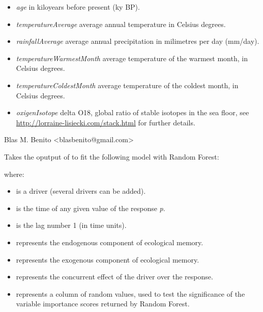 \documentclass[letterpaper]{book}
\begin{document}
\begin{Details}\relax
\begin{itemize}

\item \emph{age}  in kiloyears before present (ky BP).
\item \emph{temperatureAverage} average annual temperature in Celsius degrees.
\item \emph{rainfallAverage} average annual precipitation in milimetres per day (mm/day).
\item \emph{temperatureWarmestMonth} average temperature of the warmest month, in Celsius degrees.
\item \emph{temperatureColdestMonth} average temperature of the coldest month, in Celsius degrees.
\item \emph{oxigenIsotope} delta O18, global ratio of stable isotopes in the sea floor, see \url{http://lorraine-lisiecki.com/stack.html} for further details.

\end{itemize}

\end{Details}
%
\begin{Author}\relax
Blas M. Benito  <blasbenito@gmail.com>
\end{Author}
%
\begin{Description}\relax
Takes the oputput of  to fit the following model with Random Forest:


where:

\begin{itemize}

\item {} is a driver (several drivers can be added).
\item {} is the time of any given value of the response \emph{p}.
\item {} is the lag number 1 (in time units).
\item {}  represents the endogenous component of ecological memory.
\item {}  represents the exogenous component of ecological memory.
\item {} represents the concurrent effect of the driver over the response.
\item {} represents a column of random values, used to test the significance of the variable importance scores returned by Random Forest.

\end{itemize}

\end{Description}
\end{document}
